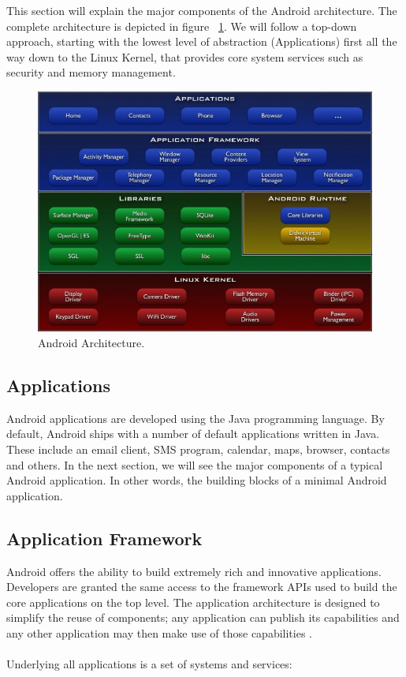 This section will explain the major components of the Android architecture. The complete architecture is depicted in figure ~\ref{fig:android_architecture}. We will follow a top-down approach, starting with the lowest level of abstraction (Applications) first all the way down to the Linux Kernel, that provides core system services such as security and memory management.

\begin{figure}[h!]
\centering
\includegraphics[width=1.0\textwidth]{images/chap4_android_architecture.jpg}
\caption{Android Architecture.}
\label{fig:android_architecture}
\end{figure}

\subsection{Applications}

Android applications are developed using the Java programming language. By default, Android ships with a number of default applications written in Java. These include an email client, SMS program, calendar, maps, browser, contacts and others. In the next section, we will see the major components of a typical Android application. In other words, the building blocks of a minimal Android application.

\subsection{Application Framework}

Android offers the ability to build extremely rich and innovative applications. Developers are granted the same access to the framework APIs used to build the core applications on the top level. The application architecture is designed to simplify the reuse of components; any application can publish its capabilities and any other application may then make use of those capabilities \cite{WhatAndroid}. 
\\ \\
Underlying all applications is a set of systems and services:


